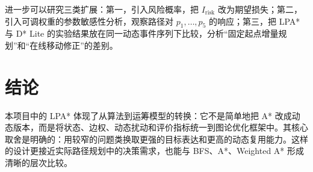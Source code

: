 \documentclass[UTF8]{ctexart}
\begin{document}
进一步可以研究三类扩展：第一，引入风险概率，把 $I_{\mathrm{risk}}$ 改为期望损失；第二，引入可调权重的参数敏感性分析，观察路径对 $p_1,\ldots,p_5$ 的响应；第三，把 LPA* 与 D* Lite 的实验结果放在同一动态事件序列下比较，分析“固定起点增量规划”和“在线移动修正”的差别。

\section{结论}

本项目中的 LPA* 体现了从算法到运筹模型的转换：它不是简单地把 A* 改成动态版本，而是将状态、边权、动态扰动和评价指标统一到图论优化框架中。其核心取舍是明确的：用较窄的问题类换取更强的目标表达和更高的动态复用能力。这样的设计更接近实际路径规划中的决策需求，也能与 BFS、A*、Weighted A* 形成清晰的层次比较。
\end{document}

